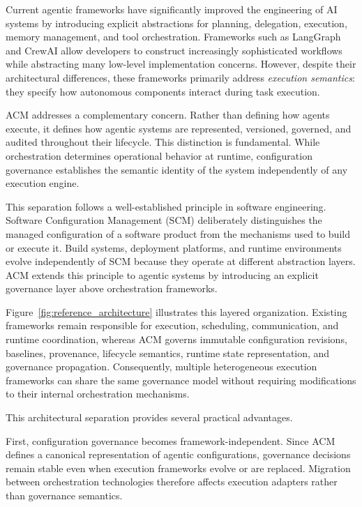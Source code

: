 \documentclass[10pt]{article}
\begin{document}
Current agentic frameworks have significantly improved the engineering of AI systems by introducing explicit abstractions for planning, delegation, execution, memory management, and tool orchestration. Frameworks such as LangGraph and CrewAI allow developers to construct increasingly sophisticated workflows while abstracting many low-level implementation concerns. However, despite their architectural differences, these frameworks primarily address \emph{execution semantics}: they specify how autonomous components interact during task execution.

ACM addresses a complementary concern. Rather than defining how agents execute, it defines how agentic systems are represented, versioned, governed, and audited throughout their lifecycle. This distinction is fundamental. While orchestration determines operational behavior at runtime, configuration governance establishes the semantic identity of the system independently of any execution engine.

This separation follows a well-established principle in software engineering. Software Configuration Management (SCM) deliberately distinguishes the managed configuration of a software product from the mechanisms used to build or execute it. Build systems, deployment platforms, and runtime environments evolve independently of SCM because they operate at different abstraction layers. ACM extends this principle to agentic systems by introducing an explicit governance layer above orchestration frameworks.

Figure~\ref{fig:reference_architecture} illustrates this layered organization. Existing frameworks remain responsible for execution, scheduling, communication, and runtime coordination, whereas ACM governs immutable configuration revisions, baselines, provenance, lifecycle semantics, runtime state representation, and governance propagation. Consequently, multiple heterogeneous execution frameworks can share the same governance model without requiring modifications to their internal orchestration mechanisms.

This architectural separation provides several practical advantages.

First, configuration governance becomes framework-independent. Since ACM defines a canonical representation of agentic configurations, governance decisions remain stable even when execution frameworks evolve or are replaced. Migration between orchestration technologies therefore affects execution adapters rather than governance semantics.
\end{document}
